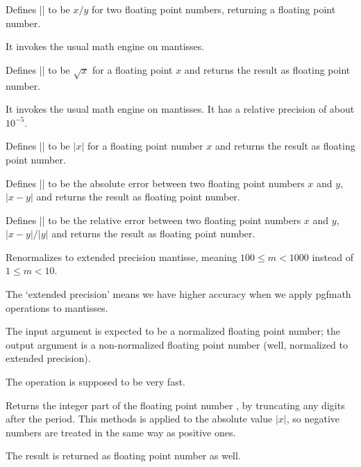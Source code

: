 \begin{command}{}
	Defines |\pgfmathresult| to be $x / y$ for two floating point numbers, returning a floating point number.
	
	It invokes the usual math engine on mantisses.
\end{command}

\begin{command}{}
	Defines |\pgfmathresult| to be $\sqrt x$ for a floating point $x$ and returns the result as floating point number.
	
	It invokes the usual math engine on mantisses. It has a relative precision of about $10^{-5}$.
\end{command}
\begin{command}{}
	Defines |\pgfmathresult| to be $\lvert x\rvert $ for a floating point number $x$ and returns the result as floating point number.
\end{command}

\begin{command}{\pgfmathfloatabserror{}}
	Defines |\pgfmathresult| to be the absolute error between two floating point numbers $x$ and $y$, $\lvert x - y\rvert $ and returns the result as floating point number.
\end{command}

\begin{command}{\pgfmathfloatrelerror{}}
	Defines |\pgfmathresult| to be the relative error between two floating point numbers $x$ and $y$, $\lvert x - y\rvert / \lvert y \rvert $ and returns the result as floating point number.
\end{command}
\begin{command}{}
Renormalizes  to extended precision mantisse, meaning
$100 \le m < 1000$ instead of $1 \le m < 10$.

The `extended precision' means we have higher accuracy when we apply pgfmath operations to mantisses.

The input argument is expected to be a normalized floating point number; the output argument is a non-normalized floating point number (well, normalized to extended precision).

The operation is supposed to be very fast.
\end{command}
\begin{command}{\pgfmathfloatint{}}
Returns the integer part of the floating point number , by truncating any digits after the period. This methods is applied to the absolute value $\rvert x \lvert$, so negative numbers are treated in the same way as positive ones.

The result is returned as floating point number as well.
\end{command}

